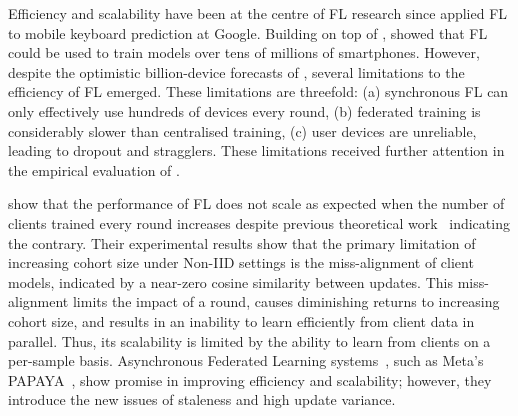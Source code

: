 Efficiency and scalability have been at the centre of FL research since \citet{GoogleKeyboard} applied FL to mobile keyboard prediction at Google. Building on top of \citet{GoogleKeyboard}, \citet{ScaleSystemDesign} showed that FL could be used to train models over tens of millions of smartphones. However, despite the optimistic billion-device forecasts of \citet{ScaleSystemDesign}, several limitations to the efficiency of FL emerged. These limitations are threefold: (a) synchronous FL can only effectively use hundreds of devices every round, (b) federated training is considerably slower than centralised training, (c) user devices are unreliable, leading to dropout and stragglers. These limitations received further attention in the empirical evaluation of \citet{LargeCohorts}.

\citet{LargeCohorts} show that the performance of FL does not scale as expected when the number of clients trained every round increases despite previous theoretical work~\citep{TighterTheory} indicating the contrary. Their experimental results show that the primary limitation of increasing cohort size under Non-IID settings is the miss-alignment of client models, indicated by a near-zero cosine similarity between updates. This miss-alignment limits the impact of a round, causes diminishing returns to increasing cohort size, and results in an inability to learn efficiently from client data in parallel. Thus, its scalability is limited by the ability to learn from clients on a per-sample basis. Asynchronous Federated Learning systems~\citep{AsynchronousFLonHetDevicesSurvey,FedBuff,AsyncrhonousOnlineFL,AsyncDropout}, such as Meta's PAPAYA~\citep{PAPAYA}, show promise in improving efficiency and scalability; however, they introduce the new issues of staleness and high update variance.


